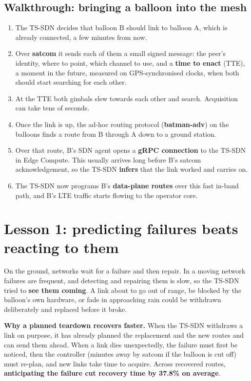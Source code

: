 \subsection{Walkthrough: bringing a balloon into the mesh}
\begin{enumerate}
  \item The TS-SDN decides that balloon B should link to balloon A, which is already connected, a few minutes from now.
  \item Over \textbf{satcom} it sends each of them a small signed message: the peer's identity, where to point, which channel to use, and a \textbf{time to enact} (TTE),
        a moment in the future, measured on GPS-synchronised clocks, when both should start searching for each other.
  \item At the TTE both gimbals slew towards each other and search. Acquisition can take tens of seconds.
  \item Once the link is up, the ad-hoc routing protocol (\textbf{batman-adv}) on the balloons finds a route from B through A down to a ground station.
  \item Over that route, B's SDN agent opens a \textbf{gRPC connection} to the TS-SDN in Edge Compute. This usually arrives long before B's satcom acknowledgement, so the
        TS-SDN \textbf{infers} that the link worked and carries on.
  \item The TS-SDN now programs B's \textbf{data-plane routes} over this fast in-band path, and B's LTE traffic starts flowing to the operator core.
\end{enumerate}

\section{Lesson 1: predicting failures beats reacting to them}

On the ground, networks wait for a failure and then repair. In a moving network failures are frequent, and detecting and repairing them is slow, so the TS-SDN tried to
\textbf{see them coming}. A link about to go out of range, be blocked by the balloon's own hardware, or fade in approaching rain could be withdrawn deliberately and replaced
before it broke.

\textbf{Why a planned teardown recovers faster.} When the TS-SDN withdraws a link on purpose, it has already planned the replacement and the new routes and can send
them ahead. When a link dies unexpectedly, the failure must first be noticed, then the controller (minutes away by satcom if the balloon is cut off) must re-plan, and new links
take time to acquire. Across recovered routes, \textbf{anticipating the failure cut recovery time by 37.8\% on average}.

